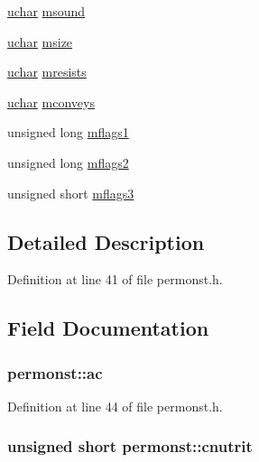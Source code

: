 \begin{DoxyCompactItemize}
\item 
\hyperlink{config_8h_a65f85814a8290f9797005d3b28e7e5fc}{uchar} \hyperlink{structpermonst_a8f9cc062b40fa92ce38e504987326190}{msound}
\item 
\hyperlink{config_8h_a65f85814a8290f9797005d3b28e7e5fc}{uchar} \hyperlink{structpermonst_a29f8d76dae8c7c96eab01dd8ec27717b}{msize}
\item 
\hyperlink{config_8h_a65f85814a8290f9797005d3b28e7e5fc}{uchar} \hyperlink{structpermonst_aa5260f69f42574bf223c5465b9c1858a}{mresists}
\item 
\hyperlink{config_8h_a65f85814a8290f9797005d3b28e7e5fc}{uchar} \hyperlink{structpermonst_aa8e81f6e7e10c01a25f928e95816fc7b}{mconveys}
\item 
unsigned long \hyperlink{structpermonst_ae298930e8d2da56fa608c05a76d073e2}{mflags1}
\item 
unsigned long \hyperlink{structpermonst_ad620729c9694b29047996af4e5380030}{mflags2}
\item 
unsigned short \hyperlink{structpermonst_ac5987c08238b33d93531fb396b0d98db}{mflags3}
\end{DoxyCompactItemize}


\subsection{Detailed Description}


Definition at line 41 of file permonst.\+h.



\subsection{Field Documentation}
\hypertarget{structpermonst_ad5fd940cc9e0321d3856a88fc02f1c91}{
\subsubsection[{ac}]{ permonst\+::ac}}\label{structpermonst_ad5fd940cc9e0321d3856a88fc02f1c91}


Definition at line 44 of file permonst.\+h.

\hypertarget{structpermonst_ac13149ec4e586659f7556acf7aab9b01}{
\subsubsection[{cnutrit}]{\setlength{\rightskip}{0pt plus 5cm}unsigned short permonst\+::cnutrit}}\label{structpermonst_ac13149ec4e586659f7556acf7aab9b01}


